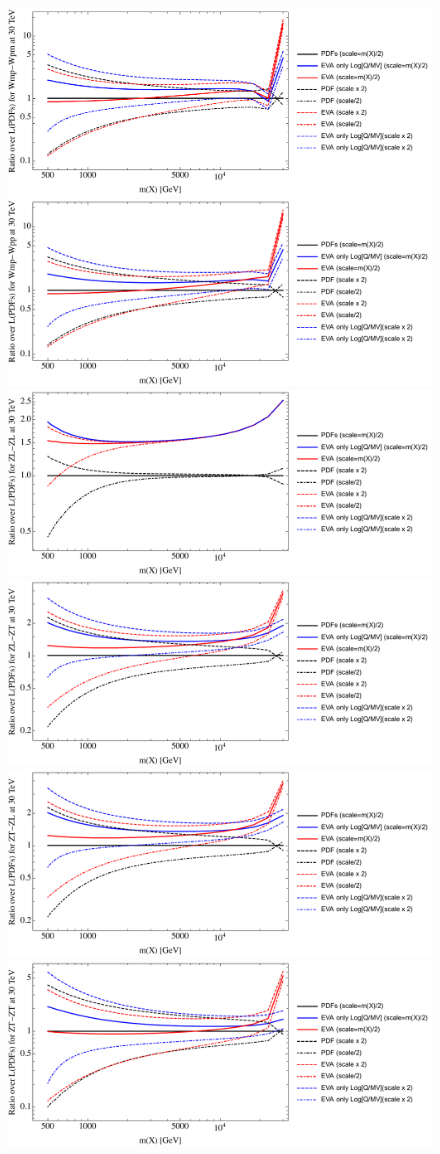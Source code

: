 \documentclass[a4paper,11pt]{article}
\begin{document}
\begin{figure}[ht]
\includegraphics[width=0.46\linewidth]{Notebooks/PlotLumi/30TeV/ratios/Wmp-Wpm.pdf}
\includegraphics[width=0.46\linewidth]{Notebooks/PlotLumi/30TeV/ratios/Wmp-Wpp.pdf}
\includegraphics[width=0.46\linewidth]{Notebooks/PlotLumi/30TeV/ratios/ZL-ZL.pdf}
\includegraphics[width=0.46\linewidth]{Notebooks/PlotLumi/30TeV/ratios/ZL-ZT.pdf}
\includegraphics[width=0.46\linewidth]{Notebooks/PlotLumi/30TeV/ratios/ZT-ZL.pdf}
\includegraphics[width=0.46\linewidth]{Notebooks/PlotLumi/30TeV/ratios/ZT-ZT.pdf}
\end{figure}
\end{document}
